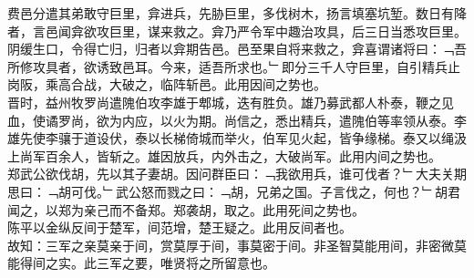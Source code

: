 费邑分遣其弟敢守巨里，弇进兵，先胁巨里，多伐树木，扬言填塞坑堑。数日有降者，言邑闻弇欲攻巨里，谋来救之。弇乃严令军中趣治攻具，后三日当悉攻巨里。阴缓生口，令得亡归，归者以弇期告邑。邑至果自将来救之，弇喜谓诸将曰：﹁吾所修攻具者，欲诱致邑耳。今来，适吾所求也。﹂即分三千人守巨里，自引精兵止岗阪，乘高合战，大破之，临阵斩邑。此用因间之势也。\\
晋时，益州牧罗尚遣隗伯攻李雄于郫城，迭有胜负。雄乃募武都人朴泰，鞭之见血，使谲罗尚，欲为内应，以火为期。尚信之，悉出精兵，遣隗伯等率领从泰。李雄先使李骧于道设伏，泰以长梯倚城而举火，伯军见火起，皆争缘梯。泰又以绳汲上尚军百余人，皆斩之。雄因放兵，内外击之，大破尚军。此用内间之势也。\\
郑武公欲伐胡，先以其子妻胡。因问群臣曰：﹁我欲用兵，谁可伐者？﹂大夫关期思曰：﹁胡可伐。﹂武公怒而戮之曰：﹁胡，兄弟之国。子言伐之，何也？﹂胡君闻之，以郑为亲己而不备郑。郑袭胡，取之。此用死间之势也。\\
陈平以金纵反间于楚军，间范增，楚王疑之。此用反间者也。\\
故知：三军之亲莫亲于间，赏莫厚于间，事莫密于间。非圣智莫能用间，非密微莫能得间之实。此三军之要，唯贤将之所留意也。
%
%
